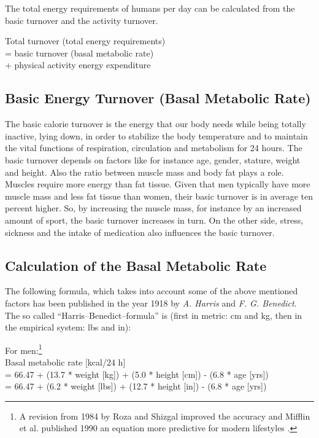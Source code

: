 \documentclass[../main.tex]{subfiles}
\begin{document}
The total energy requirements of humans per day can be calculated from the basic turnover and the activity turnover.

\vspace{2mm}

\begin{center}
\begin{fminipage}{7cm}
  Total turnover   (total energy requirements)\\
  = basic turnover (basal metabolic rate)\\
  + physical activity energy expenditure
\end{fminipage}
\end{center}

\vspace{2mm}

\subsection{Basic Energy Turnover (Basal Metabolic Rate)}

The basic calorie turnover is the energy that our body needs while being totally inactive, lying down, in order to
stabilize the body temperature and to maintain the vital functions of respiration, circulation and metabolism for 24 hours.
The basic turnover depends on factors like for instance age, gender, stature, weight and height.
Also the ratio between muscle mass and body fat plays a role.
Muscles require more energy than fat tissue.
Given that men typically have more muscle mass and less fat tissue than women, their basic turnover is in average ten percent higher.
So, by increasing the muscle mass, for instance by an increased amount of sport, the basic turnover increases in turn.
On the other side, stress, sickness and the intake of medication also influences the basic turnover.


\subsection{Calculation of the Basal Metabolic Rate}

The following formula, which takes into account some of the above mentioned factors has been published in the year 1918
by \textit{A. Harris} and \textit{F. G. Benedict}.
The so called ``Harris--Benedict--formula'' is (first in metric: cm and kg, then in the empirical system: lbs and in):

\noindent For men:\footnote{A revision from 1984 by {Roza} and {Shizgal} improved the accuracy and {Mifflin et al.}
 published 1990 an equation more predictive for modern lifestyles \cite{WikiCalorie}.}\\
Basal metabolic rate   [kcal/24 h] \\
= 66.47 + (13.7 * weight [kg]) + (5.0 * height [cm]) - (6.8 * age [yrs]) \\
= 66.47 + (6.2 * weight [lbs]) + (12.7 * height [in]) - (6.8 * age [yrs])
\end{document}
